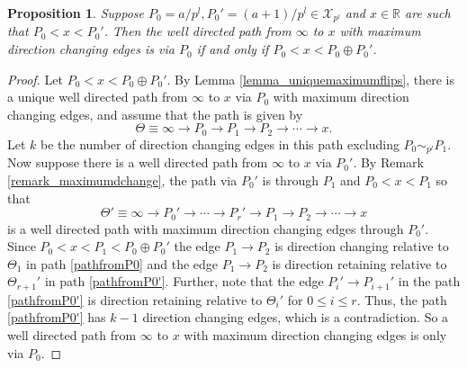\documentclass[12pt]{elsarticle}
\newtheorem{proposition}[theorem]{Proposition}
\theoremstyle{definition}
\newcommand{\field}[1]{\mathbb{#1}}          \newcommand{\Q}{\field{Q}}
\newcommand{\R}{\field{R}}                   \newcommand{\Z}{\field{Z}}
\newcommand{\mX}{{\mathcal X}}
\begin{document}
\begin{proposition}\label{prop_maxdchngP0}
	Suppose $P_0=a/p^l,P_0'=(a+1)/p^l\in \mX_{p^l}$ and $x\in\R$ are such that $P_0<x< P_0'$. Then the well directed path from $\infty$ to $x$ with maximum direction changing edges is via $P_0$ if and only if $P_0<x<P_0\oplus P_0'$.
\end{proposition}
\begin{proof}
	Let $P_0<x<P_0\oplus P_0'$. By Lemma \ref{lemma_uniquemaximumflips}, there is a unique well directed path from $\infty$ to $x$ via $P_0$ with maximum direction changing edges, and  assume that the path is given by
	\begin{equation}\label{pathfromP0}
\Theta\equiv\infty\to P_0\to P_1\to P_2\to\cdots\to x.
	\end{equation}
	Let  $k$ be the number of direction changing edges in this path excluding $P_0\sim_{p^l} P_1.$
	Now suppose there is a well directed path from $\infty$ to $x$ via $P_0'$. By Remark \ref{remark_maximumdchange}, the path via $P_0'$ is through $P_1$ and $P_0<x<P_1$ so that
	\begin{equation}\label{pathfromP0'}
\Theta'\equiv	\infty\to P_0'\to\cdots\to P_r'\to P_1\to P_2\to\cdots\to x
	\end{equation}
	is a well directed path with maximum direction changing edges through $P_0'.$ Since $P_0<x<P_1<P_0\oplus P_0'$ the edge $P_1\to P_2$ is direction changing relative to $\Theta_1$ in path \eqref{pathfromP0} and the edge $P_1\to P_2$ is direction retaining relative to $\Theta_{r+1}'$ in path \eqref{pathfromP0'}. Further, note that the edge $P_i'\to P_{i+1}'$ in the path \eqref{pathfromP0'} is direction retaining relative to $\Theta_{i}'$ for $0\le i \le r.$ Thus, the path \eqref{pathfromP0'} has $k-1$ direction changing edges, which is a contradiction. So a well directed path from $\infty$ to $x$ with maximum direction changing edges is only via $P_0.$
\end{proof}
\end{document}
